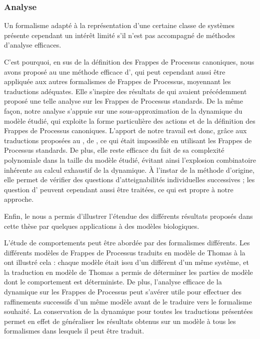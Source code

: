 \subsubsection*{Analyse}

Un formalisme adapté à la représentation d'une certaine classe de systèmes présente cependant
un intérêt limité s'il n'est pas accompagné de méthodes d'analyse efficaces.

C'est pourquoi, en sus de la définition des Frappes de Processus canoniques,
nous avons proposé au  une méthode efficace
d',
qui peut cependant aussi être appliquée aux autres formalismes
de Frappes de Processus, moyennant les traductions adéquates.
Elle s'inspire des résultats de 
qui avaient précédemment proposé une telle analyse sur les Frappes de Processus standards.
De la même façon, notre analyse
s'appuie sur une sous-approximation de la dynamique du modèle étudié,
qui exploite la forme particulière des actions et de la définition
des Frappes de Processus canoniques.
L'apport de notre travail est donc, grâce aux traductions proposées au ,
de , ce qui était impossible
en utilisant les Frappes de Processus standards.
De plus, elle reste efficace
du fait de sa complexité polynomiale dans la taille du modèle étudié,
évitant ainsi l'explosion combinatoire inhérente au calcul exhaustif de la dynamique.
À l'instar de la méthode d'origine, elle permet de vérifier des questions
d'atteignabilités individuelles successives ;
les question d'
peuvent cependant aussi être traitées,
ce qui est propre à notre approche.

\myskip

Enfin, le  nous a permis d'illustrer l'étendue
des différents résultats proposés dans cette thèse
par quelques applications à des modèles biologiques.

L'étude de comportements peut être abordée par des formalismes différents.
Les différents modèles de Frappes de Processus traduits en modèle de Thomas
à la  ont illustré cela :
chaque modèle était issu d'un  différent d'un même système,
et la traduction en modèle de Thomas a permis de déterminer
les parties de modèle dont le comportement est déterministe.
De plus, l'analyse efficace de la dynamique sur les Frappes de Processus
peut s'avérer utile pour effectuer des raffinements successifs d'un même modèle
avant de le traduire vers le formalisme souhaité.
La conservation de la dynamique %
pour toutes les traductions présentées
permet en effet de généraliser les résultats obtenus sur un modèle à tous les formalismes
dans lesquels il peut être traduit.

